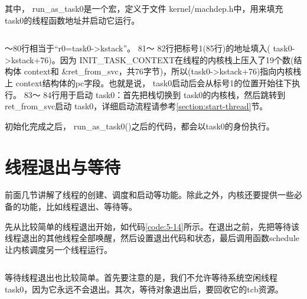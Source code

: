 \documentclass[main.tex]{subfiles}
\begin{document}
\begin{CJK*}{UTF8}{song}
\noindent
其中， run\_\-as\_\-task0是一个宏，定义于文件 kernel\-/\-machdep.h中，用来填充 task0的线程函数地址并启动它运行。

\begin{code}
\label{code:5-13}
\inputminted[firstline=76,lastline=89,linenos,numbersep=5pt,frame=lines,framesep=2mm]{c}{src/chapter05/kernel/machdep.h}
\end{code}

～80行相当于“r0=task0-\textgreater kstack”。 81～ 82行把标号1(85行)的地址填入( task0-\textgreater kstack+76)。因为 INIT\_\-TASK\_\-CONTEXT在线程的内核栈上压入了19个数(结构体 context和 \&ret\_\-from\_\-svc，共76字节)，所以(task0-\textgreater kstack+76)指向内核栈上 context结构体的pc字段。也就是说， task0启动后会从标号1的位置开始往下执行。 83～ 84行用于启动 task0：首先把栈切换到 task0的内核栈，然后跳转到 ret\_\-from\_\-svc启动 task0，详细启动流程请参考\ref{section:start-thread}节。

\par
初始化完成之后， run\_\-as\_\-task0()之后的代码，都会以task0的身份执行。

\section{线程退出与等待}
前面几节讲解了线程的创建、调度和启动等功能。除此之外，内核还要提供一些必备的功能，比如线程退出、等待等。

\par
先从比较简单的线程退出开始，如代码\ref{code:5-14}所示。在退出之前，先把等待该线程退出的其他线程全部唤醒，然后设置退出代码和状态，最后调用函数schedule让内核调度另一个线程运行。

\begin{code}
\label{code:5-14}
\inputminted[firstline=205,lastline=222,linenos,numbersep=5pt,frame=lines,framesep=2mm]{c}{src/chapter05/kernel/task.c}
\end{code}

等待线程退出也比较简单。首先要注意的是，我们不允许等待系统空闲线程task0，因为它永远不会退出。其次，等待对象退出后，要回收它的tcb资源。

\begin{code}
\label{code:5-15}
\inputminted[firstline=224,lastline=265,linenos,numbersep=5pt,frame=lines,framesep=2mm]{c}{src/chapter05/kernel/task.c}
\end{code}


\end{CJK*}
\end{document}

